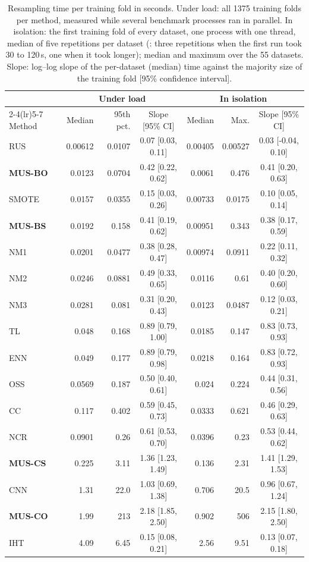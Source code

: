 \begin{table}[t]
\centering
\footnotesize
\caption{Resampling time per training fold in seconds. Under load: all 1375 training folds per method, measured while several benchmark processes ran in parallel. In isolation: the first training fold of every dataset, one process with one thread, median of five repetitions per dataset (\MUSCO: three repetitions when the first run took 30 to 120\,s, one when it took longer); median and maximum over the 55 datasets. Slope: log--log slope of the per-dataset (median) time against the majority size of the training fold [95\% confidence interval].}
\label{tab:runtime}
\setlength{\tabcolsep}{3.5pt}
\begin{tabular}{lrrcrrc}
\toprule
 & \multicolumn{3}{c}{Under load} & \multicolumn{3}{c}{In isolation} \\
\cmidrule(lr){2-4}\cmidrule(lr){5-7}
Method & Median & 95th pct. & Slope [95\% CI] & Median & Max. & Slope [95\% CI] \\
\midrule
RUS & 0.00612 & 0.0107 & 0.07 [0.03, 0.11] & 0.00405 & 0.00527 & 0.03 [-0.04, 0.10] \\
\textbf{MUS-BO} & 0.0123 & 0.0704 & 0.42 [0.22, 0.62] & 0.0061 & 0.476 & 0.41 [0.20, 0.63] \\
SMOTE & 0.0157 & 0.0355 & 0.15 [0.03, 0.26] & 0.00733 & 0.0175 & 0.10 [0.05, 0.14] \\
\textbf{MUS-BS} & 0.0192 & 0.158 & 0.41 [0.19, 0.62] & 0.00951 & 0.343 & 0.38 [0.17, 0.59] \\
NM1 & 0.0201 & 0.0477 & 0.38 [0.28, 0.47] & 0.00974 & 0.0911 & 0.22 [0.11, 0.32] \\
NM2 & 0.0246 & 0.0881 & 0.49 [0.33, 0.65] & 0.0116 & 0.61 & 0.40 [0.20, 0.60] \\
NM3 & 0.0281 & 0.081 & 0.31 [0.20, 0.43] & 0.0123 & 0.0487 & 0.12 [0.03, 0.21] \\
TL & 0.048 & 0.168 & 0.89 [0.79, 1.00] & 0.0185 & 0.147 & 0.83 [0.73, 0.93] \\
ENN & 0.049 & 0.177 & 0.89 [0.79, 0.98] & 0.0218 & 0.164 & 0.83 [0.72, 0.93] \\
OSS & 0.0569 & 0.187 & 0.50 [0.40, 0.61] & 0.024 & 0.224 & 0.44 [0.31, 0.56] \\
CC & 0.117 & 0.402 & 0.59 [0.45, 0.73] & 0.0333 & 0.621 & 0.46 [0.29, 0.63] \\
NCR & 0.0901 & 0.26 & 0.61 [0.53, 0.70] & 0.0396 & 0.23 & 0.53 [0.44, 0.62] \\
\textbf{MUS-CS} & 0.225 & 3.11 & 1.36 [1.23, 1.49] & 0.136 & 2.31 & 1.41 [1.29, 1.53] \\
CNN & 1.31 & 22.0 & 1.03 [0.69, 1.38] & 0.706 & 20.5 & 0.96 [0.67, 1.24] \\
\textbf{MUS-CO} & 1.99 & 213 & 2.18 [1.85, 2.50] & 0.902 & 506 & 2.15 [1.80, 2.50] \\
IHT & 4.09 & 6.45 & 0.15 [0.08, 0.21] & 2.56 & 9.51 & 0.13 [0.07, 0.18] \\
\bottomrule
\end{tabular}
\end{table}
